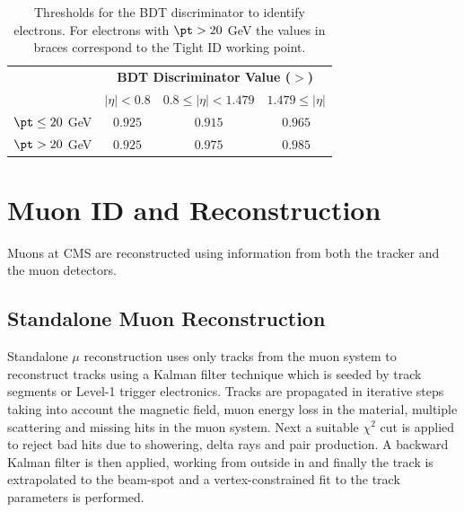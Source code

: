 \begin{table}[!ht]
\begin{center}
\begin{tabular}{|l|c|c|c|}
\multicolumn{1}{c}{ }      & \multicolumn{3}{c}{\bf BDT Discriminator Value ($>$)}                 \\
\cline{2-4}
\multicolumn{1}{c|}{ }     & $|\eta|<0.8$      & $0.8 \leq |\eta| < 1.479$  & $1.479 \leq |\eta|$  \\
\hline
$\pt\leq 20$ GeV          & $0.925$           & $0.915$                    & $0.965$              \\
$\pt>    20$ GeV          & $0.925$ & $0.975$          & $0.985$    \\
\hline
\end{tabular}
\caption{
  Thresholds for the BDT discriminator to identify electrons. For electrons with $\pt>20$ GeV the values in braces correspond to the Tight ID working point.}
\label{tab:ElectronID-Thresholds}
\end{center}
\end{table}



\section{Muon ID and Reconstruction}
Muons at CMS are reconstructed using information from both the 
tracker and the muon detectors. 
\subsection{Standalone Muon Reconstruction}
Standalone $\mu$ reconstruction uses only tracks from the muon system
to reconstruct tracks using a Kalman filter technique which is seeded
by track segments or Level-1 trigger electronics. Tracks are propagated
in iterative steps taking into account the magnetic field, muon energy loss in the material,
multiple scattering and missing hits in the muon system.
Next a suitable $\chi^{2}$ cut is applied to reject bad hits due to showering,
delta rays and pair production. A backward Kalman filter is then applied,
working from outside in and finally the track is extrapolated to the 
beam-spot and a vertex-constrained fit to the track
parameters is performed.
